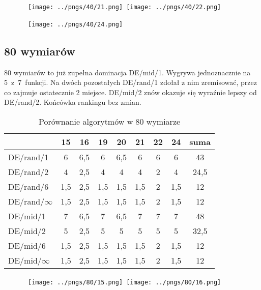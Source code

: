 \begin{figure}[H]
\centering
\mbox{
\texttt{[image: ../pngs/40/21.png]} \quad
\texttt{[image: ../pngs/40/22.png]} 
}
\end{figure}

\begin{figure}[H]
\centering
\mbox{
\texttt{[image: ../pngs/40/24.png]} \quad
}
\end{figure}

\subsection{80 wymiarów}

80 wymiarów to już zupełna dominacja DE/mid/1. Wygrywa jednoznacznie na 5~z~7~funkcji.
Na dwóch pozostałych DE/rand/1 zdołał z nim zremisować, przez co zajmuje ostatecznie 2 miejsce.
DE/mid/2 znów okazuje się wyraźnie lepszy od DE/rand/2. Końcówka rankingu bez zmian.

\begin{table}[H]
\centering
\begin{tabular}{ l | c | c | c | c | c | c | c | c}
                 & 15  & 16  & 19  & 20  & 21  & 22  & 24  & suma \\ \hline
DE/rand/1        & 6   & 6,5 & 6   & 6,5 & 6   & 6   & 6   & 43   \\ 
DE/rand/2        & 4   & 2,5 & 4   & 4   & 4   & 2   & 4   & 24,5 \\ 
DE/rand/6        & 1,5 & 2,5 & 1,5 & 1,5 & 1,5 & 2   & 1,5 & 12   \\ 
DE/rand/$\infty$ & 1,5 & 2,5 & 1,5 & 1,5 & 1,5 & 2   & 1,5 & 12   \\ 
DE/mid/1         & 7   & 6,5 & 7   & 6,5 & 7   & 7   & 7   & 48   \\
DE/mid/2         & 5   & 2,5 & 5   & 5   & 5   & 5   & 5   & 32,5 \\
DE/mid/6         & 1,5 & 2,5 & 1,5 & 1,5 & 1,5 & 2   & 1,5 & 12   \\ 
DE/mid/$\infty$  & 1,5 & 2,5 & 1,5 & 1,5 & 1,5 & 2   & 1,5 & 12   \\
\end{tabular}
\caption{Porównanie algorytmów w 80 wymiarze}
\label{table:80d}
\end{table}

\begin{figure}[H]
\centering
\mbox{
\texttt{[image: ../pngs/80/15.png]} \quad
\texttt{[image: ../pngs/80/16.png]} 
}
\end{figure}

